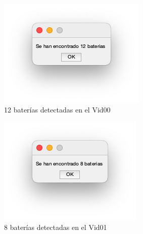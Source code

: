 \documentclass[11pt]{memoir}
\begin{document}
\begin{center}
\begin{figure}[H]
\begin{subfigure}{0.3\textwidth}
    \includegraphics[width=\textwidth]{img/S0}
    \caption{12 baterías detectadas en el Vid00}
    \label{fig:salida1}
\end{subfigure}
\hfill
\begin{subfigure}{0.3\textwidth}
    \includegraphics[width=\textwidth]{img/S1}
    \caption{8 baterías detectadas en el Vid01}
    \label{fig:salida2}
\end{subfigure}
\hfill
\begin{subfigure}{0.3\textwidth}

\end{subfigure}
\end{figure}
\end{center}
\end{document}
